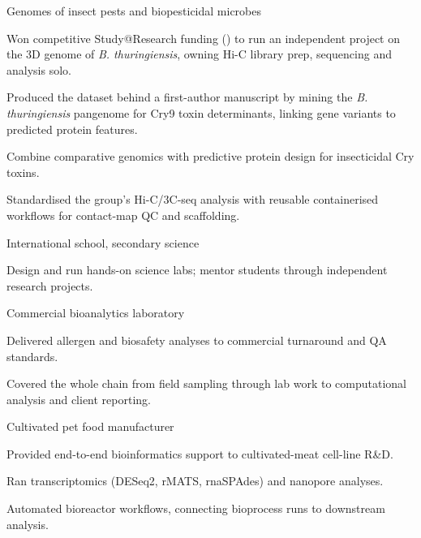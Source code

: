 \documentclass[]{deedy-resume-openfont}
\newcommand{\entrysep}{\vspace{6pt}}
\newcommand{\entrynote}[1]{{\footnotesize\color{headings}#1}\par}
\begin{document}
\entrynote{Genomes of insect pests and biopesticidal microbes}
\begin{tightemize}
\item Won competitive Study@Research funding (\GrantStudyAtResearch{}) to run an independent project on the 3D genome of \textit{B. thuringiensis}, owning Hi-C library prep, sequencing and analysis solo.
\item Produced the dataset behind a first-author manuscript by mining the \textit{B. thuringiensis} pangenome for Cry9 toxin determinants, linking gene variants to predicted protein features.
\item Combine comparative genomics with predictive protein design for insecticidal Cry toxins.
\item Standardised the group's Hi-C/3C-seq analysis with reusable containerised workflows for contact-map QC and scaffolding.
\end{tightemize}
\entrysep

\entrynote{International school, secondary science}
\begin{tightemize}
\item Design and run hands-on science labs; mentor students through independent research projects.
\end{tightemize}
\entrysep

\entrynote{Commercial bioanalytics laboratory}
\begin{tightemize}
\item Delivered allergen and biosafety analyses to commercial turnaround and QA standards.
\item Covered the whole chain from field sampling through lab work to computational analysis and client reporting.
\end{tightemize}
\entrysep

\entrynote{Cultivated pet food manufacturer}
\begin{tightemize}
\item Provided end-to-end bioinformatics support to cultivated-meat cell-line R\&D.
\item Ran transcriptomics (DESeq2, rMATS, rnaSPAdes) and nanopore analyses.
\item Automated bioreactor workflows, connecting bioprocess runs to downstream analysis.
\end{tightemize}
\entrysep
\end{document}
